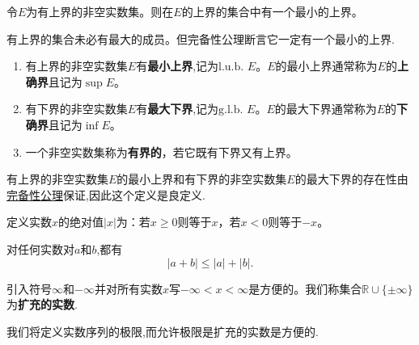 \documentclass[lang=cn,newtx,10pt,scheme=chinese]{../Template/elegantbook}
\begin{document}
\begin{axiom}[完备性公理]\label{axiom:完备性公理}
  令\(E\)为有上界的非空实数集。则在\(E\)的上界的集合中有一个最小的上界。
\end{axiom}
\begin{note}
  有上界的集合未必有最大的成员。但完备性公理断言它一定有一个最小的上界.
\end{note}

\begin{definition}[上下确界]\label{definition:上下确界}
\begin{enumerate}
  \item 有上界的非空实数集\(E\)有\textbf{最小上界},记为\(\text{l.u.b. }E\)。\(E\)的最小上界通常称为\(E\)的\textbf{上确界}且记为\(\sup E\)。

  \item 有下界的非空实数集\(E\)有\textbf{最大下界},记为\(\text{g.l.b. }E\)。\(E\)的最大下界通常称为\(E\)的\textbf{下确界}且记为\(\inf E\)。

  \item 一个非空实数集称为\textbf{有界的}，若它既有下界又有上界。
\end{enumerate}
\end{definition}
\begin{remark}
  有上界的非空实数集\(E\)的最小上界和有下界的非空实数集\(E\)的最大下界的存在性由\hyperref[axiom:完备性公理]{完备性公理}保证,因此这个定义是良定义.
\end{remark}

\begin{definition}[实数的绝对值]\label{definition:绝对值}
  定义实数\(x\)的绝对值\(\vert x\vert\)为：若\(x\geqslant0\)则等于\(x\)，若\(x<0\)则等于\(-x\)。
\end{definition}

\begin{theorem}[三角不等式]\label{theorem:三角不等式}
对任何实数对\(a\)和\(b\),都有
  \[
    \left| a+b \right|\leqslant \left| a \right|+\left| b \right|.
  \]
\end{theorem}

\begin{definition}[扩充的实数]\label{definition:扩充的实数}
  引入符号\(\infty\)和\(-\infty\)并对所有实数\(x\)写\(-\infty<x<\infty\)是方便的。我们称集合\(\mathbb{R}\cup\{\pm\infty\}\)为\textbf{扩充的实数}.
\end{definition}
\begin{note}
  我们将定义实数序列的极限,而允许极限是扩充的实数是方便的.
\end{note}
\end{document}

